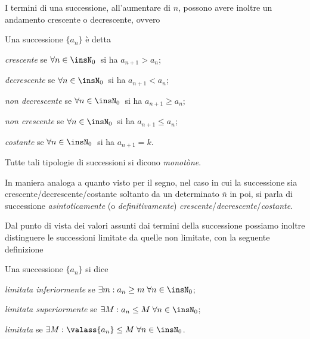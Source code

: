I termini di una successione, all'aumentare di $n$, possono avere inoltre un andamento crescente o decrescente, ovvero 

\begin{definizione}
Una successione $\{a_n\}$ è detta
\begin{itemize*}
\item \emph{crescente} se $\forall n\in\insN_0\,$ si ha $a_{n+1} > a_{n}$;
\item \emph{decrescente} se $\forall n\in\insN_0\,$ si ha $a_{n+1} < a_{n}$;
\item \emph{non decrescente} se $\forall n\in\insN_0\,$ si ha $a_{n+1} \geq a_{n}$;
\item \emph{non crescente} se $\forall n\in\insN_0\,$ si ha $a_{n+1} \leq a_{n}$;
\item \emph{costante} se $\forall n \in \insN_0\,$ si ha $a_{n+1} = k$.
\end{itemize*}
\end{definizione}

Tutte tali tipologie di successioni si dicono \emph{monotòne}.

In maniera analoga a quanto visto per il segno, nel caso in cui la successione sia crescente/{}decrescente/{}costante soltanto da un determinato $\overline{n}$ in poi, si parla di successione \emph{asintoticamente} (o \emph{definitivamente}) \emph{crescente}/{}\emph{decrescente}/{}\emph{costante}.

Dal punto di vista dei valori assunti dai termini della successione possiamo inoltre distinguere le successioni limitate da quelle non limitate, con la seguente definizione

\begin{definizione}
Una successione $\{a_n\}$ si dice 
\begin{itemize*}
\item \emph{limitata inferiormente} se $\exists m : a_n \geq m\; \forall n \in \insN_0$;
\item \emph{limitata superiormente} se $\exists M : a_n \leq M\; \forall n \in \insN_0$;
\item \emph{limitata} se $\exists M : \valass{a_n} \leq M\; \forall n \in \insN_0$.
\end{itemize*}
\end{definizione}

